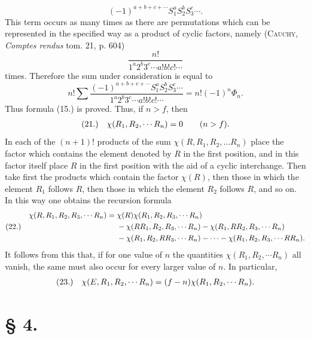 \documentclass[11pt]{article}
\makeatletter
\newcommand{\frobtag}[2]{\[\begin{array}{@{}r@{\quad}l@{}}\textup{(#1)} & \displaystyle #2\end{array}\]}
\newcommand{\frobtagc}[2]{\[\begin{array}{@{}r@{\quad}c@{}}\textup{(#1)} & \displaystyle #2\end{array}\]}
\makeatother
\begin{document}
\[
(-1)^{a+b+c+\cdots}S_1^aS_2^bS_3^c\cdots .
\]
This term occurs as many times as there are permutations which can be represented in the specified way as a product of cyclic factors, namely (\textsc{Cauchy}, \emph{Comptes rendus} tom. 21, p. 604)
\[
\frac{n!}{1^a2^b3^c\cdots a!b!c!\cdots}
\]
times. Therefore the sum under consideration is equal to
\[
n!\sum\frac{(-1)^{a+b+c+\cdots}S_1^aS_2^bS_3^c\cdots}{1^a2^b3^c\cdots a!b!c!\cdots}=n!(-1)^n\Phi_n.
\]
Thus formula (15.) is proved. Thus, if $n>f$, then
\frobtagc{21.}{\chi(R_1,R_2,\cdots R_n)=0\qquad(n>f).}
In each of the $(n+1)!$ products of the sum $\chi(R,R_1,R_2,\ldots R_n)$ place the factor which contains the element denoted by $R$ in the first position, and in this factor itself place $R$ in the first position with the aid of a cyclic interchange. Then take first the products which contain the factor $\chi(R)$, then those in which the element $R_1$ follows $R$, then those in which the element $R_2$ follows $R$, and so on. In this way one obtains the recursion formula
\frobtag{22.}{\begin{aligned}
\chi(R,R_1,R_2,R_3,\cdots R_n)={}&\chi(R)\chi(R_1,R_2,R_3,\cdots R_n)\nobreak\\
&{}-\chi(RR_1,R_2,R_3,\cdots R_n)-\chi(R_1,RR_2,R_3,\cdots R_n)\nobreak\\
&{}-\chi(R_1,R_2,RR_3,\cdots R_n)-\cdots-\chi(R_1,R_2,R_3,\cdots RR_n).
\end{aligned}}
It follows from this that, if for one value of $n$ the quantities $\chi(R_1,R_2,\cdots R_n)$ all vanish, the same must also occur for every larger value of $n$. In particular,
\frobtagc{23.}{\chi(E,R_1,R_2,\cdots R_n)=(f-n)\chi(R_1,R_2,\cdots R_n).}

\section*{§ 4.}
\end{document}
